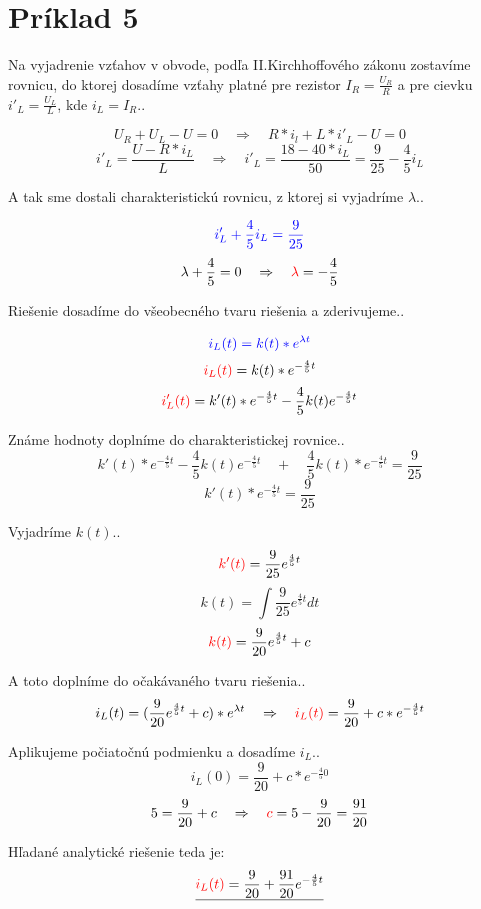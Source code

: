 \section{Príklad 5}

\vspace{0.5cm}
Na vyjadrenie vzťahov v obvode, podľa II.Kirchhoffového zákonu zostavíme rovnicu, do ktorej dosadíme vzťahy platné pre rezistor $I_R=\frac{U_R}{R}$ a pre cievku $i'_L=\frac{U_L}{L}$, kde $i_L=I_R$..

$$U_R+U_L-U=0\quad \Rightarrow \quad R*i_l+L*i'_L-U=0$$
$$i'_L=\frac{U-R*i_L}{L}\quad \Rightarrow \quad i'_L=\frac{18-40*i_L}{50}=\frac{9}{25}-\frac{4}{5}i_L$$

\vspace{0.5cm}
A tak sme dostali charakteristickú rovnicu, z ktorej si vyjadríme $\lambda$..

$$\color{blue}i'_L+\frac{4}{5}i_L=\frac{9}{25}$$
$$\lambda+\frac{4}{5}=0\quad \Rightarrow \quad {\color{red}{\lambda}}= -\frac{4}{5} $$

\vspace{0.5cm}
Riešenie dosadíme do všeobecného tvaru riešenia a zderivujeme..

$$\color{blue}i_L(t)=k(t)*e^{\lambda t}$$
$${\color{red}{i_L(t)}}=k(t)*e^{-\frac{4}{5}t}$$
$${\color{red}{i'_L(t)}}=k'(t)*e^{-\frac{4}{5}t}-\frac{4}{5}k(t)e^{-\frac{4}{5}t}$$

\vspace{0.5cm}
Známe hodnoty doplníme do charakteristickej rovnice..
$$k'(t)*e^{-\frac{4}{5}t}-\frac{4}{5}k(t)e^{-\frac{4}{5}t} \quad+\quad \frac{4}{5}k(t)*e^{-\frac{4}{5}t}=\frac{9}{25}$$
$$k'(t)*e^{-\frac{4}{5}t}=\frac{9}{25}$$

\vspace{0.5cm}
Vyjadríme $k(t)$..
$${\color{red}{k'(t)}}=\frac{9}{25}e^{\frac{4}{5}t}$$
$$k(t)=\int\frac{9}{25}e^{\frac{4}{5}t}dt$$
$${\color{red}{k(t)}}=\frac{9}{20}e^{\frac{4}{5}t}+c$$

\vspace{0.5cm}
A toto doplníme do očakávaného tvaru riešenia..
$$i_L(t)=(\frac{9}{20}e^{\frac{4}{5}t}+c)*e^{\lambda t}\quad \Rightarrow \quad {\color{red}{i_L(t)}}=\frac{9}{20}+c*e^{-\frac{4}{5}t}$$

Aplikujeme počiatočnú podmienku a dosadíme $i_L$..
$$i_L(0)=\frac{9}{20}+c*e^{-\frac{4}{5}0}$$
$$5=\frac{9}{20}+c \quad \Rightarrow \quad {\color{red}{c}}=5-\frac{9}{20}=\frac{91}{20}$$

\vspace{0.5cm}
Hľadané analytické riešenie teda je:
$$\underline{{\color{red}{i_L(t)}}=\frac{9}{20}+\frac{91}{20}e^{-\frac{4}{5}t}}$$

